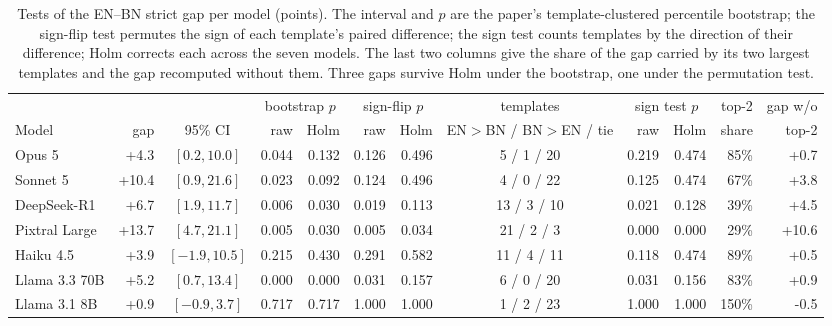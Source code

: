 \begin{table}[t]
\centering\scriptsize
\setlength{\tabcolsep}{2.6pt}
\begin{tabular}{l r c rr rr c rr r r}
\toprule
& & & \multicolumn{2}{c}{bootstrap $p$} & \multicolumn{2}{c}{sign-flip $p$} & templates & \multicolumn{2}{c}{sign test $p$} & top-2 & gap w/o \\
Model & gap & 95\% CI & raw & Holm & raw & Holm & EN$>$BN / BN$>$EN / tie & raw & Holm & share & top-2 \\
\midrule
Opus 5 & +4.3 & $[0.2, 10.0]$ & 0.044 & 0.132 & 0.126 & 0.496 & 5 / 1 / 20 & 0.219 & 0.474 & 85\% & +0.7 \\
Sonnet 5 & +10.4 & $[0.9, 21.6]$ & 0.023 & 0.092 & 0.124 & 0.496 & 4 / 0 / 22 & 0.125 & 0.474 & 67\% & +3.8 \\
DeepSeek-R1 & +6.7 & $[1.9, 11.7]$ & 0.006 & 0.030 & 0.019 & 0.113 & 13 / 3 / 10 & 0.021 & 0.128 & 39\% & +4.5 \\
Pixtral Large & +13.7 & $[4.7, 21.1]$ & 0.005 & 0.030 & 0.005 & 0.034 & 21 / 2 / 3 & 0.000 & 0.000 & 29\% & +10.6 \\
Haiku 4.5 & +3.9 & $[-1.9, 10.5]$ & 0.215 & 0.430 & 0.291 & 0.582 & 11 / 4 / 11 & 0.118 & 0.474 & 89\% & +0.5 \\
Llama 3.3 70B & +5.2 & $[0.7, 13.4]$ & 0.000 & 0.000 & 0.031 & 0.157 & 6 / 0 / 20 & 0.031 & 0.156 & 83\% & +0.9 \\
Llama 3.1 8B & +0.9 & $[-0.9, 3.7]$ & 0.717 & 0.717 & 1.000 & 1.000 & 1 / 2 / 23 & 1.000 & 1.000 & 150\% & -0.5 \\
\bottomrule
\end{tabular}
\caption{Tests of the EN--BN strict gap per model (points). The
interval and $p$ are the paper's template-clustered percentile
bootstrap; the sign-flip test permutes the sign of each template's
paired difference; the sign test counts templates by the direction
of their difference; Holm corrects each across the seven models.
The last two columns give the share of the gap carried by its two
largest templates and the gap recomputed without them. Three gaps
survive Holm under the bootstrap, one under the permutation test.}
\label{tab:gaptests}
\end{table}
